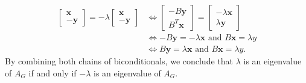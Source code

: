 \documentclass{article}
\newcommand{\1}{\mathbf{1}}
\newcommand{\0}{\mathbf{0}}
\begin{document}
\begin{enumerate}
\begin{align*}
\begin{bmatrix}
      \mathbf{x} \\ -\mathbf{y}
    \end{bmatrix}
    =
    -\lambda
    \begin{bmatrix}
      \mathbf{x} \\ -\mathbf{y}
    \end{bmatrix}
    & \iff
    \begin{bmatrix}
      -B \mathbf{y} \\
      B^T \mathbf{x}
    \end{bmatrix}
    =
    \begin{bmatrix}
      -\lambda \mathbf{x} \\ \lambda \mathbf{y}
    \end{bmatrix}
    \\
    & \iff
    -B \mathbf{y} = -\lambda \mathbf{x} \text{ and } B \mathbf{x} = \lambda y \\
    & \iff
    B \mathbf{y} = \lambda \mathbf{x} \text{ and } B \mathbf{x} = \lambda y.
  \end{align*}
  By combining both chains of biconditionals, we conclude that $\lambda$ is an eigenvalue of $A_G$ if and only if $-\lambda$ is an eigenvalue of $A_G$.


\end{enumerate}
\end{document}
